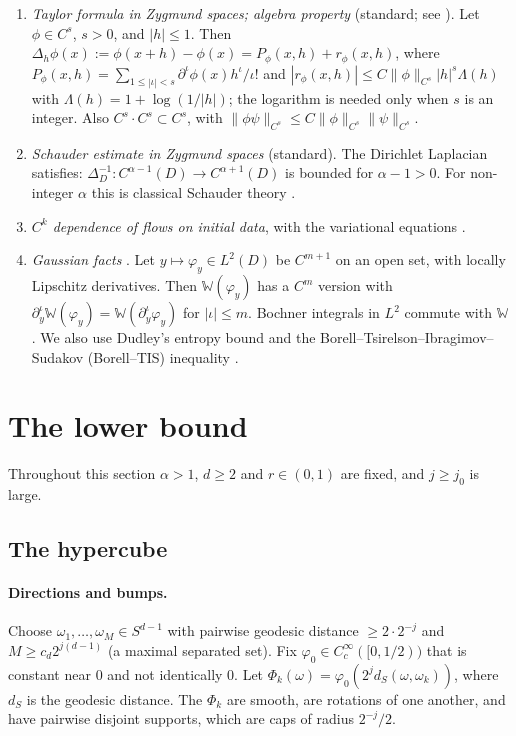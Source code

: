 \documentclass[11pt]{article}
\theoremstyle{definition}
\theoremstyle{remark}
\newcommand{\W}{\mathbb W}
\begin{document}
\begin{enumerate}[label=\textbf{(\arabic*)},leftmargin=2.2em]
\item[\textbf{(C3)}] \emph{Taylor formula in Zygmund spaces; algebra property} (standard; see \cite{Tri83}). Let $\phi\in C^s$, $s>0$, and $|h|\le1$. Then
$\Delta_h\phi(x):=\phi(x+h)-\phi(x)=P_\phi(x,h)+r_\phi(x,h)$,
where $P_\phi(x,h)=\sum_{1\le|\iota|<s}\partial^\iota\phi(x)h^\iota/\iota!$ and $|r_\phi(x,h)|\le C\|\phi\|_{C^s}|h|^s\Lambda(h)$ with $\Lambda(h)=1+\log(1/|h|)$; the logarithm is needed only when $s$ is an integer. Also $C^s\cdot C^s\subset C^s$, with $\|\phi\psi\|_{C^s}\le C\|\phi\|_{C^s}\|\psi\|_{C^s}$.
\item[\textbf{(S)}] \emph{Schauder estimate in Zygmund spaces} (standard). The Dirichlet Laplacian satisfies: $\Delta_D^{-1}:C^{\alpha-1}(D)\to C^{\alpha+1}(D)$ is bounded for $\alpha-1>0$. For non-integer $\alpha$ this is classical Schauder theory \cite[Ch.~6]{GT}.
\item[\textbf{(ODE)}] \emph{$C^k$ dependence of flows on initial data}, with the variational equations \cite[Ch.~V]{Har64}.
\item[\textbf{(G)}] \emph{Gaussian facts} \cite{GN16}. Let $y\mapsto\varphi_y\in L^2(D)$ be $C^{m+1}$ on an open set, with locally Lipschitz derivatives. Then $\W(\varphi_y)$ has a $C^m$ version with $\partial^\iota_y\W(\varphi_y)=\W(\partial_y^\iota\varphi_y)$ for $|\iota|\le m$. Bochner integrals in $L^2$ commute with $\W$. We also use Dudley's entropy bound \cite{Dud67} and the Borell--Tsirelson--Ibragimov--Sudakov (Borell--TIS) inequality \cite{Bor75,TIS76}.
\end{enumerate}

\section{The lower bound}\label{sec:lower}

Throughout this section $\alpha>1$, $d\ge2$ and $r\in(0,1)$ are fixed, and $j\ge j_0$ is large.

\subsection{The hypercube}

\paragraph{Directions and bumps.} Choose $\omega_1,\dots,\omega_M\in S^{d-1}$ with pairwise geodesic distance $\ge2\cdot2^{-j}$ and $M\ge c_d2^{j(d-1)}$ (a maximal separated set). Fix $\varphi_0\in C^\infty_c([0,1/2))$ that is constant near $0$ and not identically $0$. Let $\Phi_k(\omega)=\varphi_0(2^jd_S(\omega,\omega_k))$, where $d_S$ is the geodesic distance. The $\Phi_k$ are smooth, are rotations of one another, and have pairwise disjoint supports, which are caps of radius $2^{-j}/2$.
\end{document}

